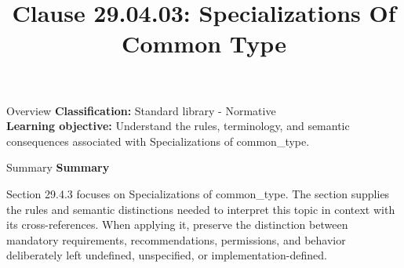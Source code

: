 \documentclass[10pt,letterpaper]{article}
\title{Clause 29.04.03: Specializations Of Common Type}
\author{}
\date{}
\begin{document}
\maketitle
\begin{CornellOverviewBox}{Overview}
\textbf{Classification:} Standard library - Normative\\[2pt]
\textbf{Learning objective:} Understand the rules, terminology, and semantic consequences associated with Specializations of common\_type.
\end{CornellOverviewBox}\begin{CornellSummaryBox}{Summary}
{\sffamily\bfseries\color{Accent} Summary}\par\vspace{3pt}Section 29.4.3 focuses on Specializations of common\_type. The section supplies the rules and semantic distinctions needed to interpret this topic in context with its cross-references. When applying it, preserve the distinction between mandatory requirements, recommendations, permissions, and behavior deliberately left undefined, unspecified, or implementation-defined.
\end{CornellSummaryBox}
\end{document}
